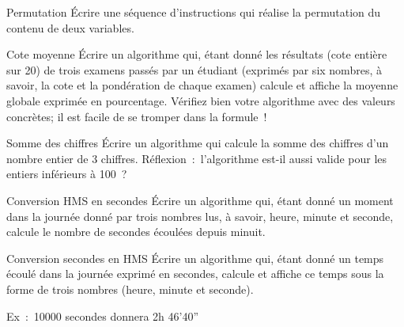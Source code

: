 \begin{Exercice}{Permutation}
	Écrire une séquence d’instructions qui réalise la permutation du contenu
	de deux variables.
\end{Exercice}

\begin{Exercice}{Cote moyenne}
	Écrire un algorithme qui, étant donné les résultats (cote entière sur
	20) de trois examens passés par un étudiant (exprimés par six nombres,
	à savoir, la cote et la pondération de chaque examen) calcule et
	affiche la moyenne globale exprimée en pourcentage. Vérifiez bien votre
	algorithme avec des valeurs concrètes; il est facile de se tromper dans
	la formule~!
\end{Exercice}

\begin{Exercice}{Somme des chiffres}
	Écrire un algorithme qui calcule la somme des chiffres
	d’un nombre entier de 3 chiffres.
	Réflexion~:~l’algorithme est-il aussi valide pour les entiers inférieurs
	à 100~?
\end{Exercice}

\begin{Exercice}{Conversion HMS en secondes}
	Écrire un algorithme qui, étant donné un moment dans la journée donné
	par trois nombres lus, à savoir, heure, minute et seconde, calcule le
	nombre de secondes écoulées depuis minuit.
\end{Exercice}

\begin{Exercice}{Conversion secondes en HMS}
	Écrire un algorithme qui, étant donné un temps écoulé dans la journée
	exprimé en secondes, calcule et affiche ce temps sous la forme de trois
	nombres (heure, minute et seconde).

	Ex~:~10000 secondes donnera 2h 46'40''
\end{Exercice}
